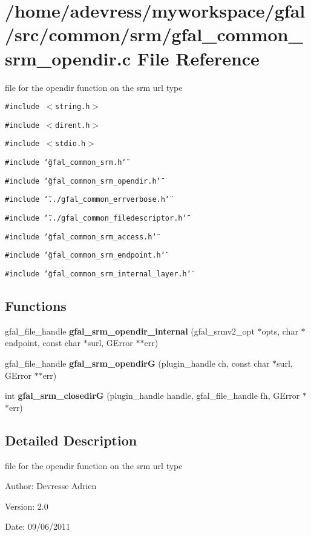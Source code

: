\section{/home/adevress/myworkspace/gfal/src/common/srm/gfal\_\-common\_\-srm\_\-opendir.c File Reference}
\label{gfal__common__srm__opendir_8c}
file for the opendir function on the srm url type 

{\tt \#include $<$string.h$>$}\par
{\tt \#include $<$dirent.h$>$}\par
{\tt \#include $<$stdio.h$>$}\par
{\tt \#include \char`\"{}gfal\_\-common\_\-srm.h\char`\"{}}\par
{\tt \#include \char`\"{}gfal\_\-common\_\-srm\_\-opendir.h\char`\"{}}\par
{\tt \#include \char`\"{}../gfal\_\-common\_\-errverbose.h\char`\"{}}\par
{\tt \#include \char`\"{}../gfal\_\-common\_\-filedescriptor.h\char`\"{}}\par
{\tt \#include \char`\"{}gfal\_\-common\_\-srm\_\-access.h\char`\"{}}\par
{\tt \#include \char`\"{}gfal\_\-common\_\-srm\_\-endpoint.h\char`\"{}}\par
{\tt \#include \char`\"{}gfal\_\-common\_\-srm\_\-internal\_\-layer.h\char`\"{}}\par
\subsection*{Functions}
\begin{CompactItemize}
\item 
gfal\_\-file\_\-handle \textbf{gfal\_\-srm\_\-opendir\_\-internal} (gfal\_\-srmv2\_\-opt $\ast$opts, char $\ast$endpoint, const char $\ast$surl, GError $\ast$$\ast$err)\label{gfal__common__srm__opendir_8c_328539269e85b42a470ed35e16aa0be7}

\item 
gfal\_\-file\_\-handle \textbf{gfal\_\-srm\_\-opendir\-G} (plugin\_\-handle ch, const char $\ast$surl, GError $\ast$$\ast$err)\label{gfal__common__srm__opendir_8c_58f9e4c9a67df383c89c62120cd2bc6c}

\item 
int \textbf{gfal\_\-srm\_\-closedir\-G} (plugin\_\-handle handle, gfal\_\-file\_\-handle fh, GError $\ast$$\ast$err)\label{gfal__common__srm__opendir_8c_a110ca5125e7c1ee1d21c8d8451060a9}

\end{CompactItemize}


\subsection{Detailed Description}
file for the opendir function on the srm url type 

\begin{Desc}
\item[Author:]Devresse Adrien \end{Desc}
\begin{Desc}
\item[Version:]2.0 \end{Desc}
\begin{Desc}
\item[Date:]09/06/2011 \end{Desc}
